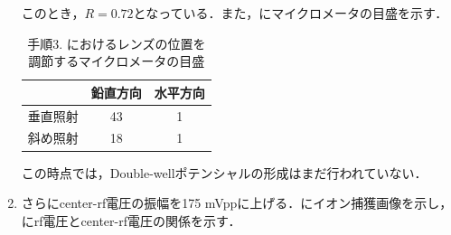 \begin{enumerate}
このとき，$R=0.72$となっている．また，にマイクロメータの目盛を示す．

\begin{table}[h]
\begin{center}
	\caption{手順3. におけるレンズの位置を調節するマイクロメータの目盛}
	\label{tab:3_2D}
	\begin{tabular}{c|cc} \hline \hline
		&鉛直方向&水平方向 \\ \hline
		垂直照射&43 & 1 \\ 
		斜め照射&18 & 1 \\ \hline
	\end{tabular}
\end{center}
\end{table}

この時点では，Double-wellポテンシャルの形成はまだ行われていない．

\item さらにcenter-rf電圧の振幅を175 mVppに上げる．にイオン捕獲画像を示し，にrf電圧とcenter-rf電圧の関係を示す．


\end{enumerate}
